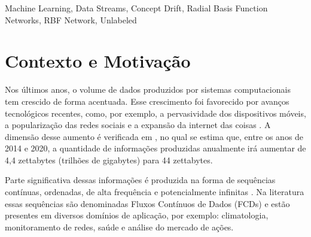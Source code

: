 \documentclass[qual, classic, a4paper]{ufbathesis}
\begin{document}
\abstract

\blindtext

\begin{keywords}
    Machine Learning, Data Streams, Concept Drift, Radial Basis Function Networks, RBF Network, Unlabeled
\end{keywords}


\tableofcontents

\listoffigures

\listoftables

\mainmatter

% 
% 
% 
%

 \label{introducao}

\section{Contexto e Motivação}

Nos últimos anos, o volume de dados produzidos por sistemas computacionais tem crescido de forma acentuada.
%
Esse crescimento foi favorecido por avanços tecnológicos recentes, como, por exemplo, 
a pervasividade dos dispositivos móveis,
a popularização das redes sociais e 
a expansão da internet das coisas \cite{Cohen:BigData:2009:MSN:1687553.1687576}.
%
A dimensão desse aumento é verificada em \cite{idc_report}, 
no qual se estima que, entre os anos de 2014 e 2020,
a quantidade de informações produzidas anualmente irá aumentar de 4,4 zettabytes (trilhões de gigabytes) para 44 zettabytes.

Parte significativa dessas informações é produzida na forma de sequências contínuas, ordenadas, de alta frequência e potencialmente infinitas \cite{Aggarwal:2006:DSM:1196418}.
%
Na literatura essas sequências são denominadas Fluxos Contínuos de Dados (FCDs) e estão presentes em diversos domínios de aplicação, por exemplo:
climatologia, 
monitoramento de redes,
saúde e análise do mercado de ações.
\end{document}
